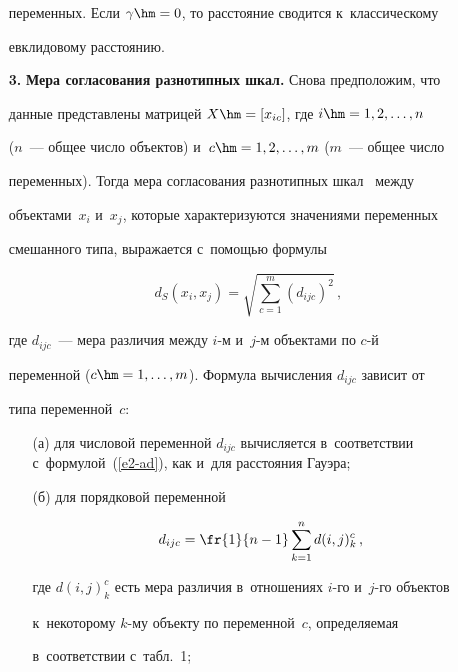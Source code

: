\begin{itemize}
переменных. Если $\gamma\hm=0$, то расстояние сводится к~классическому 


евклидовому расстоянию.





  \item[\textbf{3.}] \textbf{Мера согласования разнотипных шкал.} Снова предположим, что 


данные представлены матрицей $X\hm= [x_{ic}]$, где $i \hm= 1, 2, \ldots , n$ 


($n$~--- общее число объектов) и~$c\hm = 1, 2, \ldots, m$ ($m$~--- общее число 


переменных). Тогда мера согласования разнотипных шкал~\cite{16-ad} между 


объектами~$x_i$ и~$x_j$, которые характеризуются значениями переменных 


смешанного типа, выражается с~помощью формулы


  \begin{equation}


  d_S(x_i,x_j)=\sqrt{\sum\limits^m_{c=1} (d_{ijc})^2}\,,


  \label{e5-ad}


  \end{equation}


где $d_{ijc}$~--- мера различия между $i$-м и~$j$-м объектами по $c$-й 


переменной ($c\hm = 1, \ldots , m$). Формула вычисления $d_{ijc}$ зависит от 


типа переменной~$c$:


\begin{itemize}


  \item[(а)] для числовой переменной $d_{ijc}$ вычисляется в~соответствии с~формулой~(\ref{e2-ad}), как и~для расстояния Гауэра;


  \item[(б)] для порядковой переменной


  $$


  d_{ijc}=\fr{1}{n-1}\sum\limits^n_{k=1} d(i,j)_k^c\,,


  $$


где $d(i,j)_k^c$ есть мера различия в~отношениях $i$-го и~$j$-го объектов 


к~некоторому $k$-му объекту по переменной~$c$, определяемая 


в~соответствии с~табл.~1;






\end{itemize}
\end{itemize}
